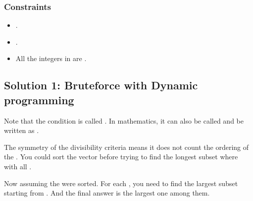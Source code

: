 \documentclass[letterpaper,12pt,english]{book}
\begin{document}
\subsubsection{Constraints}
\label{\detokenize{Dynamic_Programming/05_DP_368_Largest_Divisible_Subset:constraints}}\begin{itemize}
\item {} 
\sphinxAtStartPar
{}.

\item {} 
\sphinxAtStartPar
{}.

\item {} 
\sphinxAtStartPar
All the integers in  are .

\end{itemize}


\subsection{Solution 1: Bruteforce with Dynamic programming}
\label{\detokenize{Dynamic_Programming/05_DP_368_Largest_Divisible_Subset:solution-1-bruteforce-with-dynamic-programming}}
\sphinxAtStartPar
Note that the condition  is called . In mathematics, it can also be called  and be written as .

\sphinxAtStartPar
The symmetry of the divisibility criteria means it does not count the ordering of the . You could sort the vector  before trying to find the longest subset  where  with all .

\sphinxAtStartPar
Now assuming the  were sorted. For each , you need to find the largest subset  starting from . And the final answer is the largest one among them.
\end{document}
